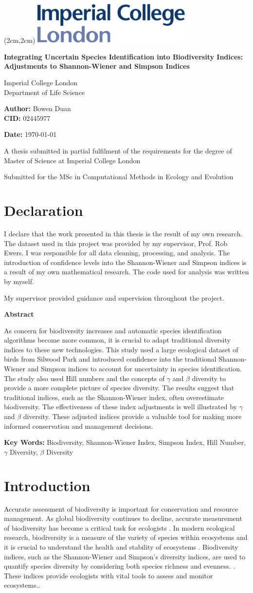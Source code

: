 \documentclass[a4paper,12pt]{article}
\newcommand{\coverpage}{
    \thispagestyle{empty}
    \begin{textblock*}{6cm}(2cm,2cm) 
        \includegraphics[width=8cm]{Figures/imperial.pdf} %
    \end{textblock*}
    \begin{center}
        \vspace*{3.5cm} 
        \Huge \textbf{Integrating Uncertain Species Identification into Biodiversity Indices: Adjustments to Shannon-Wiener and Simpson Indices} \\
        \vspace{1cm}
        
        \Large Imperial College London \\
        Department of Life Science \\
        
        \vspace{2cm}
        
        \large \textbf{Author:} Bowen Duan \\
        \textbf{CID:} 02445977 \\
        
        \vfill
        
        \large \textbf{Date:} \monthyear\today \\
        
        \vspace{1.5cm}
        
        \large A thesis submitted in partial fulfilment of the requirements for the degree of \\
        Master of Science at Imperial College London \\
        
        \vspace{0.5cm}
        
        \large Submitted for the MSc in Computational Methods in Ecology and Evolution
        
    \end{center}
    \newpage
}
\newcommand{\declarationpage}{
    \thispagestyle{empty}
    \section*{Declaration}

I declare that the work presented in this thesis is the result of my own research. The dataset used in this project was provided by my supervisor, Prof. Rob Ewers. I was responsible for all data cleaning, processing, and analysis. The introduction of confidence levels into the Shannon-Wiener and Simpson indices is a result of my own mathematical research. The code used for analysis was written by myself.

My supervisor provided guidance and supervision throughout the project.


    \newpage
}
\begin{document}
\coverpage
\declarationpage
\tableofcontents
\newpage


\begin{center}
\textbf{\Large Abstract}
\end{center}


As concern for biodiversity increases and automatic species identification algorithms become more common, it is crucial to adapt traditional diversity indices to these new technologies. This study used a large ecological dataset of birds from Silwood Park and introduced confidence into the traditional Shannon-Wiener and Simpson indices to account for uncertainty in species identification. The study also used Hill numbers and the concepts of $\gamma$ and $\beta$ diversity to provide a more complete picture of species diversity. The results suggest that traditional indices, such as the Shannon-Wiener index, often overestimate biodiversity. The effectiveness of these index adjustments is well illustrated by $\gamma$ and $\beta$ diversity. These adjusted indices provide a valuable tool for making more informed conservation and management decisions.

\vspace{1cm}

\noindent \textbf{Key Words:} Biodiversity, Shannon-Wiener Index, Simpson Index, Hill Number, $\gamma$ Diversity, $\beta$ Diversity

\newpage

\section{Introduction}


Accurate assessment of biodiversity is important for conservation and resource management. As global biodiversity continues to decline, accurate measurement of biodiversity has become a critical task for ecologists \citep{mace20072010,cardinale2012biodiversity}. In modern ecological research, biodiversity is a measure of the variety of species within ecosystems and it is crucial to understand the health and stability of ecosystems \citep{tilman2014biodiversity}. Biodiversity indices, such as the Shannon-Wiener and Simpson's diversity indices, are used to quantify species diversity by considering both species richness and evenness. \citep{shannon1948mathematical, simpson1949measurement,gotelli2013measuring}. These indices provide ecologists with vital tools to assess and monitor ecosystems.\citep{peet1974measurement, hill1973diversity}.
\end{document}
